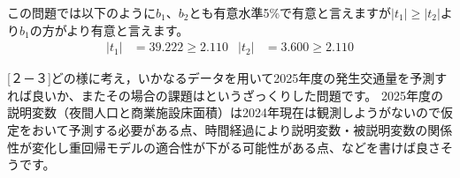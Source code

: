 \documentclass{jsarticle}
\begin{document}
この問題では以下のように$b_1$、$b_2$とも有意水準5\%で有意と言えますが$|t_1|\ge |t_2|$より$b_1$の方がより有意と言えます。
\begin{align*}
|t_1|&=39.222\ge2.110&|t_2|&=3.600\ge2.110
\end{align*}

[２－３]どの様に考え，いかなるデータを用いて2025年度の発生交通量を予測すれば良いか、またその場合の課題はというざっくりした問題です。
2025年度の説明変数（夜間人口と商業施設床面積）は2024年現在は観測しようがないので仮定をおいて予測する必要がある点、時間経過により説明変数・被説明変数の関係性が変化し重回帰モデルの適合性が下がる可能性がある点、などを書けば良さそうです。
\end{document}
